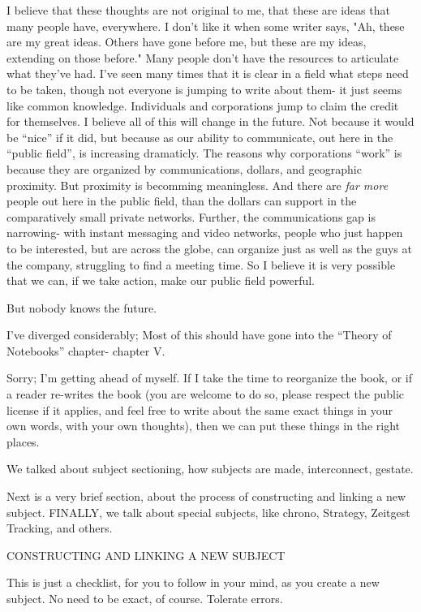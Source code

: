 \documentclass[oneside]{book}
\begin{document}
I believe that these thoughts are not original to me, that these are
ideas that many people have, everywhere. I don't like it when some
writer says, "Ah, these are my great ideas. Others have gone before
me, but these are my ideas, extending on those before." Many people
don't have the resources to articulate what they've had. I've seen
many times that it is clear in a field what steps need to be taken,
though not everyone is jumping to write about them- it just seems like
common knowledge. Individuals and corporations jump to claim the
credit for themselves. I believe all of this will change in the
future. Not because it would be ``nice'' if it did, but because as our
ability to communicate, out here in the ``public field'', is increasing
dramaticly. The reasons why corporations ``work'' is because they are
organized by communications, dollars, and geographic proximity. But
proximity is becomming meaningless. And there are \emph{far more} people
out here in the public field, than the dollars can support in the
comparatively small private networks. Further, the communications gap
is narrowing- with instant messaging and video networks, people who
just happen to be interested, but are across the globe, can organize
just as well as the guys at the company, struggling to find a meeting
time. So I believe it is very possible that we can, if we take action,
make our public field powerful.

But nobody knows the future.

I've diverged considerably; Most of this should have gone into the
``Theory of Notebooks'' chapter- chapter V.

Sorry; I'm getting ahead of myself. If I take the time to reorganize
the book, or if a reader re-writes the book (you are welcome to do so,
please respect the public license if it applies, and feel free to
write about the same exact things in your own words, with your own
thoughts), then we can put these things in the right places.

We talked about subject sectioning, how subjects are made,
interconnect, gestate.

Next is a very brief section, about the process of constructing and
linking a new subject. FINALLY, we talk about special subjects, like
chrono, Strategy, Zeitgest Tracking, and others.

CONSTRUCTING AND LINKING A NEW SUBJECT

This is just a checklist, for you to follow in your mind, as you
create a new subject. No need to be exact, of course. Tolerate errors.
\end{document}
